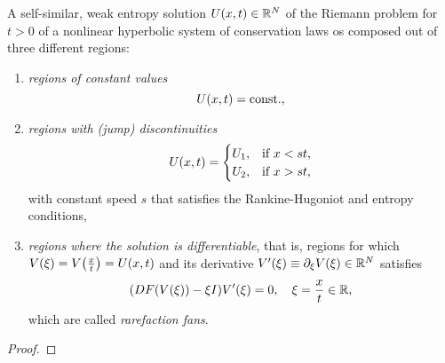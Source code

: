 \begin{theorem}
	A self-similar, weak entropy solution \(U\parentheses*{x, t} \in \R^N\) of the Riemann problem for \(t > 0\) of a nonlinear hyperbolic system of conservation laws os composed out of three different regions:
	\begin{enumerate}
		\item \emph{regions of constant values}
		\[
			U\parentheses*{x, t} = \text{const.},
		\]
		\item \emph{regions with (jump) discontinuities}
		\[
			U\parentheses*{x, t} = \begin{cases}
				U_1, & \text{if }x < st,\\
				U_2, & \text{if }x > st,
			\end{cases}
		\]
		with constant speed \(s\) that satisfies the Rankine-Hugoniot and entropy conditions,
		\item \emph{regions where the solution is differentiable}, that is, regions for which \(V\parentheses*{\xi} = V\parentheses*{\frac{x}{t}} = U\parentheses*{x, t}\) and its derivative \(V'\parentheses*{\xi} \equiv \partial_\xi V\parentheses*{\xi} \in \R^N\) satisfies
		\[
			\parentheses*{DF\parentheses*{V\parentheses*{\xi}} - \xi I}V'\parentheses*{\xi} = 0, \quad \xi = \frac{x}{t} \in \R,
		\]
		which are called \emph{rarefaction fans}.
	\end{enumerate}
\end{theorem}

\begin{proof}
	
\end{proof}
